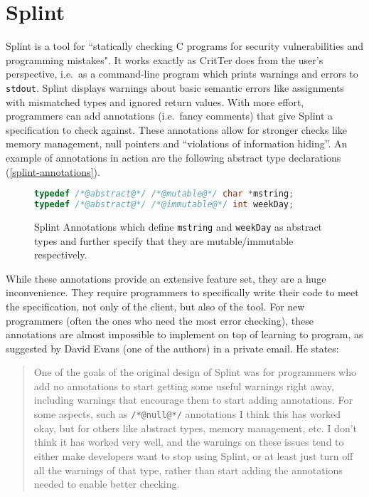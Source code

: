 \documentclass[12pt]{report}
\newcommand{\programName}{CritTer\xspace}
\begin{document}
\section{Splint}
\label{sec:splint}

Splint is a tool for ``statically checking C programs for security vulnerabilities and programming 
mistakes"\cite[p.\ 9]{splint-manual}. It works exactly as \programName does from the user's
perspective, i.e.\ as a command-line program which prints warnings and errors to \lstinline{stdout}. 
Splint displays warnings about basic semantic errors like assignments with mismatched types and 
ignored return values. With more effort, programmers can add annotations (i.e.\ fancy comments) that 
give Splint a specification to check against. These annotations allow for stronger checks like memory 
management, null pointers and ``violations of information hiding''\cite[p. 9]{splint-manual}. An 
example of annotations in action are the following abstract type declarations (\autoref{splint-annotations}).

\begin{figure}
\begin{lstlisting}[frame=single, language=C]
typedef /*@abstract@*/ /*@mutable@*/ char *mstring;
typedef /*@abstract@*/ /*@immutable@*/ int weekDay;
\end{lstlisting}
\caption[Splint Annotations]{Splint Annotations which define \lstinline{mstring} and \lstinline{weekDay} as abstract types and further specify that they are mutable\slash immutable respectively.} 
\label{splint-annotations}
\end{figure}

While these annotations provide an extensive feature set, they are a huge inconvenience. They 
require programmers to specifically write their code to meet the specification, not only of the client, but 
also of the tool. For new programmers (often the ones who need the most error checking), these 
annotations are almost impossible to implement on top of learning to program, as suggested by  
David Evans (one of the authors) in a private email. He states:
\begin{quote} \singlespacing
One of the goals of the original design of 
Splint was for programmers who add no annotations to start getting some useful warnings right away, 
including warnings that encourage them to start adding annotations.  For some aspects, such as 
\lstinline{/*@null@*/} annotations I think this has worked okay, but for others like abstract types, 
memory management, etc. I don't think it has worked very well, and the warnings on these issues tend 
to either make developers want to stop using Splint, or at least just turn off all the warnings of that type, 
rather than start adding the annotations needed to enable better checking.\cite{evans-email} 
\end{quote}
\end{document}
